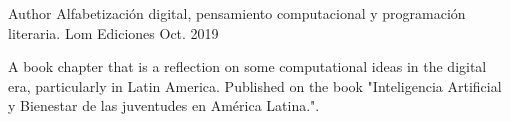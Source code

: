 

\begin{cventries}

  \cventry
    {Author} %
    {Alfabetización digital, pensamiento computacional y programación literaria.} %
    {Lom Ediciones} %
    {Oct. 2019} %
    {
      \begin{cvitems} %
        \item {A book chapter that is a reflection on some computational ideas in the digital era, particularly in Latin America. Published on the book "Inteligencia Artificial y Bienestar de las juventudes en América Latina.".}
      \end{cvitems}
    }

\end{cventries}

